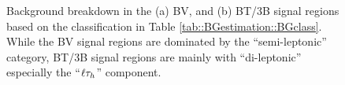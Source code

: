 \clearpage
\begin{figure}[h]
  \centering
    \caption{ Background breakdown in the (a) BV, and (b) BT/3B signal regions based on the classification in Table \ref{tab::BGestimation::BGclass}. While the BV signal regions are dominated by the ``semi-leptonic'' category, BT/3B signal regions are mainly with ``di-leptonic'' especially the ``$\ell\tau_h$'' component.
 \label{fig::BGestimation::BGcomposition_objRep} }
\end{figure}


\clearpage


